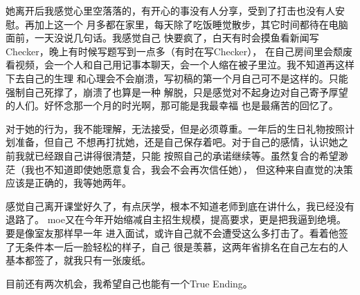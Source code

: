 她离开后我感觉心里空落落的，有开心的事没有人分享，受到了打击也没有人安慰。再加上这一个
月多都在家里，每天除了吃饭睡觉散步，其它时间都待在电脑面前，一天没说几句话。我感觉自己
快要疯了，白天有时会摸鱼看新闻写Checker，晚上有时候写题写到一点多（有时在写Checker），
在自己房间里会颓废看视频，会一个人和自己用记事本聊天，会一个人缩在被子里泣。我不知道再这样下去自己的生理
和心理会不会崩溃，写初稿的第一个月自己可不是这样的。只能强制自己死撑了，崩溃了也算是一种
解脱，只是感觉对不起身边对自己寄予厚望的人们。好怀念那一个月的时光啊，那可能是我最幸福
也是最痛苦的回忆了。

对于她的行为，我不能理解，无法接受，但是必须尊重。一年后的生日礼物按照计划准备，但自己
不想再打扰她，还是自己保存着吧。对于自己的感情，认识她之前我就已经跟自己讲得很清楚，只能
按照自己的承诺继续等。虽然复合的希望渺茫（我也不知道即使她愿意复合，我会不会再次信任她），
但这种来自直觉的决策应该是正确的，我等她两年。

感觉自己离开课堂好久了，有点厌学，根本不知道老师到底在讲什么，我已经没有退路了。
moe又在今年开始缩减自主招生规模，提高要求，更是把我逼到绝境。要是像室友那样早一年
进入面试，或许自己就不会遭受这么多打击了。看着他签了无条件本一后一脸轻松的样子，自己
很是羡慕，这两年省排名在自己左右的人基本都签了，就我只有一张废纸。

目前还有两次机会，我希望自己也能有一个True Ending。
